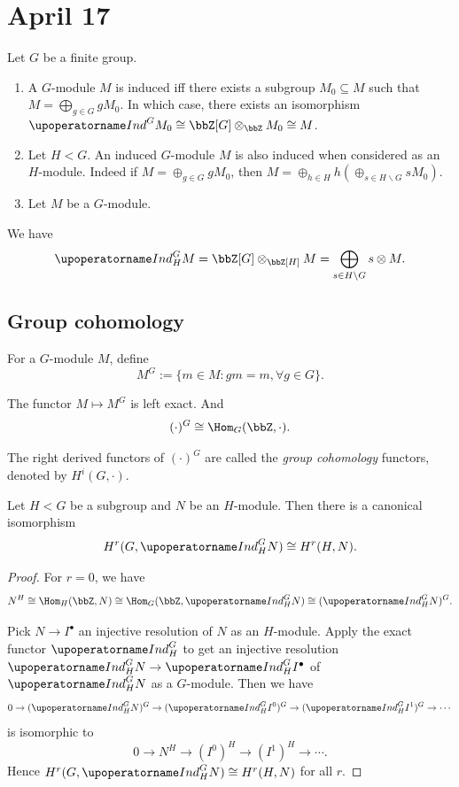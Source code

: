 \section{April 17}




  \begin{remark}
    Let $G$ be a finite group.
    \begin{enumerate}
      \item A $G$-module $M$ is induced iff there exists a subgroup $M_0 \subseteq M$ such that $M = \bigoplus_{g \in G} g M_0$.
      In which case, there exists an isomorphism $\Ind^G M_0 \cong \bbZ[G] \otimes_{\bbZ} M_0 \cong M$.
      \item Let $H < G$. An induced $G$-module $M$ is also induced when considered as an $H$-module.
        Indeed if $M = \oplus_{g \in G} g M_0$, then $M = \oplus_{h \in H} h \left( \oplus_{s \in H\backslash G} s M_0 \right)$.
      \item Let $M$ be a $G$-module. 
        \Yang{}
    \end{enumerate}
  \end{remark}

  \begin{remark}
    We have 
    \[ \Ind^G_H M = \bbZ[G] \otimes_{\bbZ[H]} M = \bigoplus_{s \in H\backslash G} s \otimes M. \]
  \end{remark}


\subsection{Group cohomology}


  \begin{definition}
    For a $G$-module $M$, define
    \[ M^G := \{ m \in M : g m = m, \forall g \in G \}. \]
  \end{definition}
  The functor $M \mapsto M^G$ is left exact.
  And 
  \[ (\cdot)^G \cong \Hom_G(\bbZ, \cdot). \]

  The right derived functors of $(\cdot)^G$ are called the \emph{group cohomology} functors, denoted by $H^i(G, \cdot)$.


  \begin{theorem}
    Let $H < G$ be a subgroup and $N$ be an $H$-module. 
    Then there is a canonical isomorphism
    \[ H^r(G, \Ind^G_H N) \cong H^r(H, N). \]
  \end{theorem}
  \begin{proof}
    For $r = 0$, we have
    \[ N^H \cong \Hom_H(\bbZ, N) \cong \Hom_G(\bbZ, \Ind^G_H N) \cong (\Ind^G_H N)^G. \]

    Pick $N \to I^\bullet$ an injective resolution of $N$ as an $H$-module.
    Apply the exact functor $\Ind^G_H$ to get an injective resolution $\Ind^G_H N \to \Ind^G_H I^\bullet$ of $\Ind^G_H N$ as a $G$-module.
    Then we have
    \[ 0 \to (\Ind^G_H N)^G \to (\Ind^G_H I^0)^G \to (\Ind^G_H I^1)^G \to \cdots \]
    is isomorphic to
    \[ 0 \to N^H \to (I^0)^H \to (I^1)^H \to \cdots. \]
    Hence $H^r(G, \Ind^G_H N) \cong H^r(H, N)$ for all $r$.
  \end{proof}

